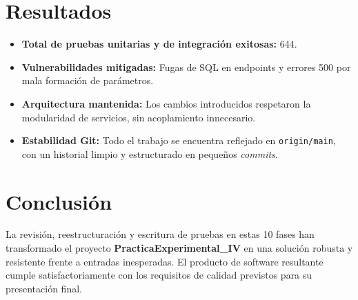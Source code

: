 \documentclass[12pt,a4paper]{article}
\begin{document}
\section{Resultados}

\begin{itemize}
    \item \textbf{Total de pruebas unitarias y de integración exitosas:} 644.
    \item \textbf{Vulnerabilidades mitigadas:} Fugas de SQL en endpoints y errores 500 por mala formación de parámetros.
    \item \textbf{Arquitectura mantenida:} Los cambios introducidos respetaron la modularidad de servicios, sin acoplamiento innecesario.
    \item \textbf{Estabilidad Git:} Todo el trabajo se encuentra reflejado en \texttt{origin/main}, con un historial limpio y estructurado en pequeños \textit{commits}.
\end{itemize}

\section{Conclusión}
La revisión, reestructuración y escritura de pruebas en estas 10 fases han transformado el proyecto \textbf{PracticaExperimental\_IV} en una solución robusta y resistente frente a entradas inesperadas. El producto de software resultante cumple satisfactoriamente con los requisitos de calidad previstos para su presentación final.
\end{document}
